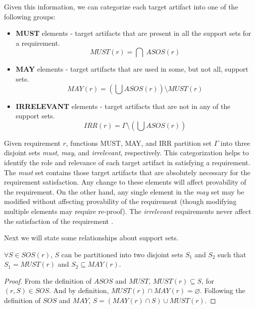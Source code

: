 Given this information, we can categorize each target artifact into one of the following groups:

\begin{itemize}
  \item \textbf{MUST} elements - target artifacts that are present in all the support sets for a requirement.
      $$ MUST (r) = \bigcap \ ASOS(r) $$

  \item \textbf{MAY} elements - target artifacts that are used in some, but not all, support sets.
      $$MAY(r) = (\bigcup ASOS (r)) \setminus MUST (r) $$

  \item \textbf{IRRELEVANT} elements - target artifacts that are not in any of the support sets. $$IRR(r) = \Gamma \setminus (\bigcup ASOS (r))$$
\end{itemize}

Given requirement $r$, functions MUST, MAY, and IRR partition set $\Gamma$ into three disjoint sets \emph{must}, \emph{may}, and \emph{irrelevant}, respectively. This categorization helps to identify the role and relevance of each target artifact in satisfying a requirement. The \emph{must} set contains those target artifacts that are absolutely necessary for the requirement satisfaction.  Any change to these elements will affect provability of the requirement. On the other hand, any single element in the \emph{may} set may be modified without affecting provability of the requirement (though modifying multiple elements may require re-proof).   The \emph{irrelevant} requirements never affect the satisfaction of the requirement \cite{Murugesan16:renext}. 

Next we will state some relationships about support sets.

\begin{lemma}
  \label{lem:sos-must-may}
 $\forall S \in SOS(r)$, $S$ can be partitioned into two disjoint sets $S_1$ and $S_2$
  such that $S_1 = MUST(r)$ and $S_2 \subseteq MAY(r)$.
\end{lemma}
\begin{proof}
 From the definition of $ASOS$ and $MUST$, $MUST(r) \subseteq S$, for $(r, S) \in SOS$. And
 by definition, $MUST(r) \cap MAY(r) = \varnothing$. Following the definition of $SOS$
 and $MAY$, $S = (MAY(r) \cap S) \cup MUST(r)$.
\end{proof}
\vspace{2mm}

